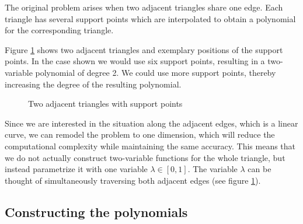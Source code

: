 \documentclass{article}
\begin{document}
The original problem arises when two adjacent triangles share one edge.
Each triangle has several support points which are interpolated to obtain a polynomial for the corresponding triangle.

Figure \ref{fig:two-triangles-and-some-support-points} shows two adjacent triangles and exemplary positions of the support points.
In the case shown we would use six support points, resulting in a two-variable polynomial of degree 2. We could use more support points, thereby increasing the degree of the resulting polynomial.

\begin{figure}[ht]
  \centering
  \caption{Two adjacent triangles with support points}
  \label{fig:two-triangles-and-some-support-points}
\end{figure}

Since we are interested in the situation along the adjacent edges, which is a linear curve, we can remodel the problem to one dimension, which will reduce the computational complexity while maintaining the same accuracy. This means that we do not actually construct two-variable functions for the whole triangle, but instead parametrize it with one variable $\lambda \in [0,1]$. The variable $\lambda$ can be thought of simultaneously traversing both adjacent edges (see figure \ref{fig:two-triangles-and-some-support-points}).

\subsection{Constructing the polynomials}
\label{sec:constructing-polynomials}
\end{document}
